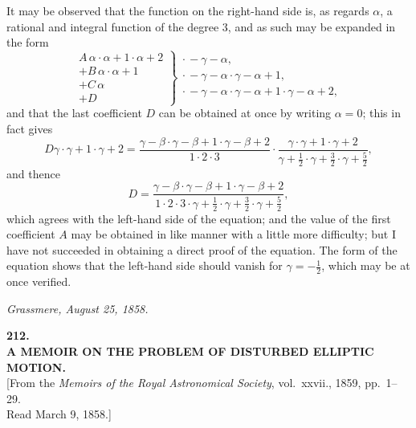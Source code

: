 \documentclass[11pt]{article}
\begin{document}
It may be observed that the function on the right-hand side is, as regards $\alpha$, a rational and integral function of the degree 3, and as such may be expanded in the form
\[
\left.\begin{array}{l}
A\,\alpha\cdot\alpha+1\cdot\alpha+2\\
+B\,\alpha\cdot\alpha+1\\
+C\,\alpha\\
+D
\end{array}\right\} \begin{array}{l}\cdot\,-\gamma-\alpha,\\ \cdot\,-\gamma-\alpha\cdot\gamma-\alpha+1,\\ \cdot\,-\gamma-\alpha\cdot\gamma-\alpha+1\cdot\gamma-\alpha+2,\end{array}
\]
and that the last coefficient $D$ can be obtained at once by writing $\alpha = 0$; this in fact gives
\[
D\gamma\cdot\gamma+1\cdot\gamma+2 = \frac{\gamma-\beta\cdot\gamma-\beta+1\cdot\gamma-\beta+2}{1\cdot 2\cdot 3}\cdot\frac{\gamma\cdot\gamma+1\cdot\gamma+2}{\gamma+\tfrac{1}{2}\cdot\gamma+\tfrac{3}{2}\cdot\gamma+\tfrac{5}{2}},
\]
and thence
\[
D = \frac{\gamma-\beta\cdot\gamma-\beta+1\cdot\gamma-\beta+2}{1\cdot 2\cdot 3\cdot\gamma+\tfrac{1}{2}\cdot\gamma+\tfrac{3}{2}\cdot\gamma+\tfrac{5}{2}},
\]
which agrees with the left-hand side of the equation; and the value of the first coefficient $A$ may be obtained in like manner with a little more difficulty; but I have not succeeded in obtaining a direct proof of the equation. The form of the equation shows that the left-hand side should vanish for $\gamma = -\tfrac{1}{2}$, which may be at once verified.

\medskip

\noindent\textit{Grassmere, August 25, 1858.}

\bigskip


\begin{center}
\textbf{212.}\\[0.5em]
{\large\bfseries A MEMOIR ON THE PROBLEM OF DISTURBED ELLIPTIC MOTION.}\\[0.5em]
[From the \textit{Memoirs of the Royal Astronomical Society}, vol.\ xxvii., 1859, pp.\ 1--29.\\
Read March 9, 1858.]
\end{center}
\end{document}
